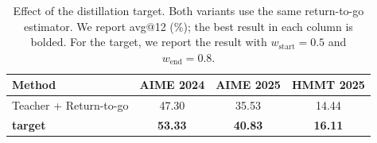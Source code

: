 \begin{table}[t]
\centering
\small
\caption{
Effect of the distillation target. Both variants use the same return-to-go
estimator. We report avg@12 (\%); the best result in each column is bolded. For the \ours{} target, we report the result with $w_{\mathrm{start}}=0.5$ and $w_{\mathrm{end}}=0.8$.
}
\label{tab:logit_interpolant_ablation}
\begin{tabular}{lccc}
\toprule
Method
& AIME 2024
& AIME 2025
& HMMT 2025 \\
\midrule
Teacher + Return-to-go
& 47.30
& 35.53
& 14.44 \\
\textbf{\oursbold{} target}
& \textbf{53.33}
& \textbf{40.83}
& \textbf{16.11} \\
\bottomrule
\end{tabular}
\end{table}